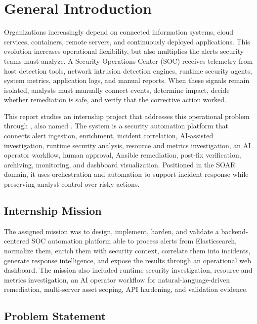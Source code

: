 \chapter*{General Introduction}

Organizations increasingly depend on connected information systems, cloud services, containers, remote servers, and continuously deployed applications. This evolution increases operational flexibility, but also multiplies the alerts security teams must analyze. A Security Operations Center (SOC) receives telemetry from host detection tools, network intrusion detection engines, runtime security agents, system metrics, application logs, and manual reports. When these signals remain isolated, analysts must manually connect events, determine impact, decide whether remediation is safe, and verify that the corrective action worked.

This report studies an internship project that addresses this operational problem through \project{}, also named \projectlong{}. The system is a security automation platform that connects alert ingestion, enrichment, incident correlation, AI-assisted investigation, runtime security analysis, resource and metrics investigation, an AI operator workflow, human approval, Ansible remediation, post-fix verification, archiving, monitoring, and dashboard visualization. Positioned in the SOAR domain, it uses orchestration and automation to support incident response while preserving analyst control over risky actions.

\section*{Internship Mission}

The assigned mission was to design, implement, harden, and validate a backend-centered SOC automation platform able to process alerts from Elasticsearch, normalize them, enrich them with security context, correlate them into incidents, generate response intelligence, and expose the results through an operational web dashboard. The mission also included runtime security investigation, resource and metrics investigation, an AI operator workflow for natural-language-driven remediation, multi-server asset scoping, API hardening, and validation evidence.

\section*{Problem Statement}

